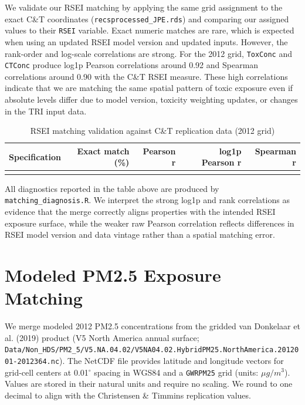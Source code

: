 \documentclass{article}
\begin{document}
We validate our RSEI matching by applying the same grid assignment to the exact C\&T coordinates (\texttt{recsprocessed\_JPE.rds}) and comparing our assigned values to their \texttt{RSEI} variable. Exact numeric matches are rare, which is expected when using an updated RSEI model version and updated inputs. However, the rank-order and log-scale correlations are strong. For the 2012 grid, \texttt{ToxConc} and \texttt{CTConc} produce log1p Pearson correlations around 0.92 and Spearman correlations around 0.90 with the C\&T RSEI measure. These high correlations indicate that we are matching the same spatial pattern of toxic exposure even if absolute levels differ due to model version, toxicity weighting updates, or changes in the TRI input data.

\begin{table}[h]
\centering
\caption{RSEI matching validation against C\&T replication data (2012 grid)}
\begin{tabular}{lrrrr}
\toprule
Specification & Exact match (\%) & Pearson r & log1p Pearson r & Spearman r \\
\midrule
\\
\bottomrule
\end{tabular}
\end{table}

All diagnostics reported in the table above are produced by \texttt{matching\_diagnosis.R}. We interpret the strong log1p and rank correlations as evidence that the merge correctly aligns properties with the intended RSEI exposure surface, while the weaker raw Pearson correlation reflects differences in RSEI model version and data vintage rather than a spatial matching error.

\section{Modeled PM2.5 Exposure Matching}

We merge modeled 2012 PM2.5 concentrations from the gridded van Donkelaar et al. (2019) product (V5 North America annual surface; \texttt{Data/Non\_HDS/PM2\_5/V5.NA.04.02/V5NA04.02.HybridPM25.NorthAmerica.2012001-2012364.nc}). The NetCDF file provides latitude and longitude vectors for grid-cell centers at 0.01$^\circ$ spacing in WGS84 and a \texttt{GWRPM25} grid (units: $\mu g/m^3$). Values are stored in their natural units and require no scaling. We round to one decimal to align with the Christensen \& Timmins replication values.
\end{document}
